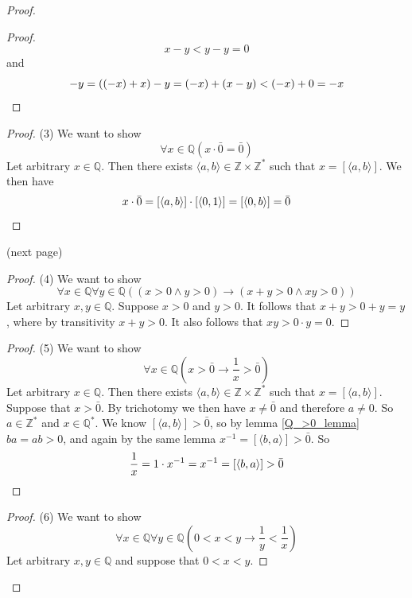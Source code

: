 \documentclass{report}
\begin{document}
\begin{proof}
\begin{proof}
\begin{equation*}
x-y<y-y=0
\end{equation*}
and
\begin{equation*}
-y=((-x)+x)-y=(-x)+(x-y)<(-x)+0=-x\qedhere
\end{equation*}
\end{proof}
\begin{proof}(3)
We want to show
\begin{equation*}
\forall x\in\mathbb Q(x\cdot\bar0=\bar0)
\end{equation*}
Let arbitrary $x\in\mathbb Q$. Then there exists $\langle a,b\rangle\in\mathbb Z\times\mathbb Z^*$ such that $x=[\langle a,b\rangle]$. We then have
\begin{equation*}
x\cdot\bar0=[\langle a,b\rangle]\cdot[\langle 0,1\rangle]=[\langle 0,b\rangle]=\bar0\qedhere
\end{equation*}
\end{proof}
\noindent(next page)\newpage
\begin{proof}(4)
We want to show
\begin{equation*}
\forall x\in\mathbb Q\forall y\in\mathbb Q((x>0\land y>0)\to(x+y>0\land xy>0))
\end{equation*}
Let arbitrary $x,y\in\mathbb Q$. Suppose $x>0$ and $y>0$. It follows that $x+y>0+y=y$, where by transitivity $x+y>0$. It also follows that
$xy>0\cdot y=0$.
\end{proof}
\begin{proof}(5)
We want to show
\begin{equation*}
\forall x\in\mathbb Q\left(x>\bar0\to\frac{1}{x}>\bar0\right)
\end{equation*}
Let arbitrary $x\in\mathbb Q$. Then there exists $\langle a,b\rangle\in\mathbb Z\times\mathbb Z^*$ such that $x=[\langle a,b\rangle]$. 
Suppose that $x>\bar0$. By trichotomy we then have $x\neq\bar0$ and therefore $a\neq0$. So $a\in\mathbb Z^*$ and $x\in\mathbb Q^*$. We know $[\langle a,b\rangle]>\bar0$, so by lemma \ref{Q_>0_lemma} $ba=ab>0$, and again by the same lemma 
$x^{-1}=[\langle b,a\rangle]>\bar0$. So
\begin{equation*}
\frac{1}{x}=1\cdot x^{-1}=x^{-1}=[\langle b,a\rangle]>\bar0\qedhere
\end{equation*}
\end{proof}
\begin{proof}(6)
We want to show
\begin{equation*}
\forall x\in\mathbb Q\forall y\in\mathbb Q\left(0<x<y\to\frac{1}{y}<\frac{1}{x}\right)
\end{equation*}
Let arbitrary $x,y\in\mathbb Q$ and suppose that $0<x<y$.

\end{proof}
\end{proof}
\end{document}
